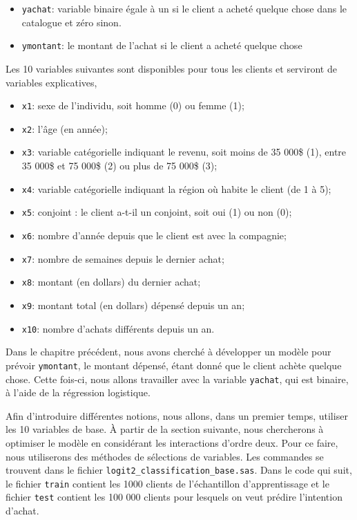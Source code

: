 \documentclass[
  11pt,
  letterpaper,
]{book}
\providecommand{\tightlist}{%
  \setlength{\itemsep}{0pt}\setlength{\parskip}{0pt}}
\theoremstyle{definition}
\theoremstyle{definition}
\theoremstyle{definition}
\theoremstyle{definition}
\theoremstyle{remark}
\begin{document}
\begin{itemize}
\tightlist
\item
  \texttt{yachat}: variable binaire égale à un si le client a acheté quelque chose dans le catalogue et zéro sinon.
\item
  \texttt{ymontant}: le montant de l'achat si le client a acheté quelque chose
\end{itemize}

Les 10 variables suivantes sont disponibles pour tous les clients et serviront de variables explicatives,

\begin{itemize}
\tightlist
\item
  \texttt{x1}: sexe de l'individu, soit homme (0) ou femme (1);
\item
  \texttt{x2}: l'âge (en année);
\item
  \texttt{x3}: variable catégorielle indiquant le revenu, soit moins de 35 000\$ (1), entre 35 000\$ et 75 000\$ (2) ou plus de 75 000\$ (3);
\item
  \texttt{x4}: variable catégorielle indiquant la région où habite le client (de 1 à 5);
\item
  \texttt{x5}: conjoint : le client a-t-il un conjoint, soit oui (1) ou non (0);
\item
  \texttt{x6}: nombre d'année depuis que le client est avec la compagnie;
\item
  \texttt{x7}: nombre de semaines depuis le dernier achat;
\item
  \texttt{x8}: montant (en dollars) du dernier achat;
\item
  \texttt{x9}: montant total (en dollars) dépensé depuis un an;
\item
  \texttt{x10}: nombre d'achats différents depuis un an.
\end{itemize}

Dans le chapitre précédent, nous avons cherché à développer un modèle pour prévoir \texttt{ymontant}, le montant dépensé, étant donné que le client achète quelque chose. Cette fois-ci, nous allons travailler avec la variable \texttt{yachat}, qui est binaire, à l'aide de la régression logistique.

Afin d'introduire différentes notions, nous allons, dans un premier temps, utiliser les 10 variables de base. À partir de la section suivante, nous chercherons à optimiser le modèle en considérant les interactions d'ordre deux. Pour ce faire, nous utiliserons des méthodes de sélections de variables. Les commandes se trouvent dans le fichier \texttt{logit2\_classification\_base.sas}. Dans le code qui suit, le fichier \texttt{train} contient les 1000 clients de l'échantillon d'apprentissage et le fichier \texttt{test} contient les 100 000 clients pour lesquels on veut prédire l'intention d'achat.
\end{document}
